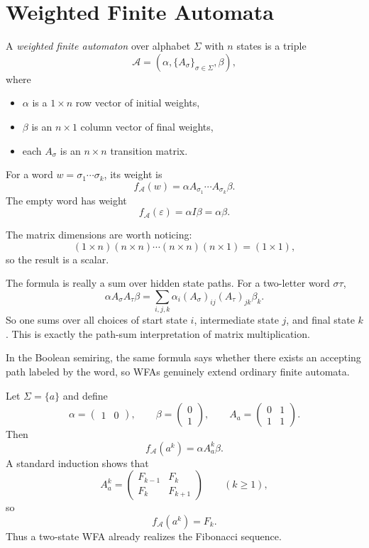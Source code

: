\section{Weighted Finite Automata}

\begin{definition}
A \emph{weighted finite automaton} over alphabet $\Sigma$ with $n$ states is a triple
\[
  \mathcal{A} = (\alpha, \{A_\sigma\}_{\sigma \in \Sigma}, \beta),
\]
where
\begin{itemize}
  \item $\alpha$ is a $1 \times n$ row vector of initial weights,
  \item $\beta$ is an $n \times 1$ column vector of final weights,
  \item each $A_\sigma$ is an $n \times n$ transition matrix.
\end{itemize}
For a word $w = \sigma_1 \cdots \sigma_k$, its weight is
\[
  f_{\mathcal A}(w) = \alpha A_{\sigma_1} \cdots A_{\sigma_k} \beta.
\]
The empty word has weight
\[
  f_{\mathcal A}(\varepsilon) = \alpha I \beta = \alpha\beta.
\]
\end{definition}

The matrix dimensions are worth noticing:
\[
  (1\times n)(n\times n)\cdots(n\times n)(n\times 1) = (1\times 1),
\]
so the result is a scalar.

The formula is really a sum over hidden state paths. For a two-letter word $\sigma\tau$,
\[
  \alpha A_\sigma A_\tau \beta
  = \sum_{i,j,k} \alpha_i (A_\sigma)_{ij}(A_\tau)_{jk}\beta_k.
\]
So one sums over all choices of start state $i$, intermediate state $j$, and final state $k$. This is exactly the path-sum interpretation of matrix multiplication.

In the Boolean semiring, the same formula says whether there exists an accepting path labeled by the word, so WFAs genuinely extend ordinary finite automata.

\begin{example}
Let $\Sigma=\{a\}$ and define
\[
  \alpha = \begin{pmatrix}1 & 0\end{pmatrix},
  \qquad
  \beta = \begin{pmatrix}0\\1\end{pmatrix},
  \qquad
  A_a = \begin{pmatrix}0 & 1\\1 & 1\end{pmatrix}.
\]
Then
\[
  f_{\mathcal A}(a^k) = \alpha A_a^k \beta.
\]
A standard induction shows that
\[
  A_a^k = \begin{pmatrix}F_{k-1} & F_k\\ F_k & F_{k+1}\end{pmatrix}
  \qquad (k \ge 1),
\]
so
\[
  f_{\mathcal A}(a^k) = F_k.
\]
Thus a two-state WFA already realizes the Fibonacci sequence.
\end{example}

